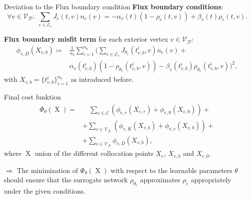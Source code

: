 \documentclass[9pt]{beamer}
\begin{document}
\begin{frame}{Deviation to the Flux boundary condition}
    \textbf{Flux boundary conditions}:
    \begin{equation*}
        \forall v \in \mathcal{V}_\mathcal{D} \colon \; \sum_{e\in \mathcal{E}_v}J_e \left( t, v \right)  n_e  \left( v \right) =-\alpha_v \left( t \right)   \left( 1-\rho_e \left(t, v \right) \right)  + \beta_v \left( t \right)  \rho_e \left(t, v \right).
    \end{equation*}

    \vspace{3mm}

    \textbf{Flux boundary misfit term} for each exterior vertex $v \in \mathcal{V}_{\mathcal{D}}$:
    \begin{equation*}
        \begin{aligned} 
            \phi_{v,D}  \left( X_{v,b} \right) \coloneqq & \frac{1}{n_b} \sum_{i=1}^{n_b} \bigg( \sum_{e \in \mathcal{E}_v} J_{\theta_e}\left( t_{v,b}^i, v \right) n_e  \left( v \right) + \\
            & \alpha_v \left( t_{v,b}^i \right)  \left( 1- \rho_{\theta_e}  \left( t_{v,b}^i, v \right) \right) - \beta_v \left( t_{v,b}^i \right) \rho_{\theta_e}  \left( t_{v,b}^i, v \right) \bigg)^2,
        \end{aligned}
    \end{equation*}
    with $X_{v,b} = \{t_{v,b}^i\}_{i=1}^{n_b}$ as introduced before.
\end{frame}



\begin{frame}{Final cost funktion}
    \begin{equation*}
        \begin{aligned} 
            \Phi_{\theta} \left( \operatorname{X} \right)  = & \quad \sum_{e \in \mathcal{E}}  \left(  \phi_{e,r}  \left( X_{e,r} \right) + \phi_{e,0}  \left( X_{e,0} \right)  \right) + \\
            & + \sum_{v \in \mathcal{V}_\mathcal{K}}  \left(  \phi_{v,K}  \left( X_{v,b} \right) + \phi_{v,c} \left( X_{v,b} \right)  \right) + \\
            & + \sum_{v \in \mathcal{V}_\mathcal{D}} \phi_{v,D} \left( X_{v,b} \right),
        \end{aligned}
    \end{equation*}
    where $\operatorname{X}$ union of the different collocation points $X_e$, $X_{v,b}$ and $X_{e,0}$. \\

    \vspace{3mm}

    $\Rightarrow$ The minimization of $\Phi_{\theta} \left( \operatorname{X} \right)$ with respect to the learnable parameters $\theta$ should ensure that the surrogate network $\rho_{\theta_e}$ approximates $\rho_{e}$ appropriately under the given conditions. 
\end{frame}
\end{document}
